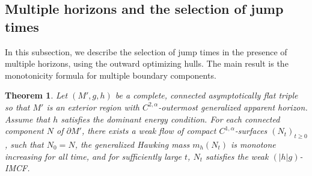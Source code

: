 \documentclass[11pt, letterpaper]{amsart}
\newtheorem{thm}{Theorem}[section]
\theoremstyle{definition}
\theoremstyle{remark}
\begin{document}
\subsection{Multiple horizons and the selection of jump times}\label{sect-multi-horizons}

In this subsection, we describe the selection of jump times in the presence of multiple horizons, using the outward optimizing hulls. The main result is the monotonicity formula for multiple boundary components.

\begin{thm}\label{thm-monotonicity-multiple}
	Let $(M', g, h)$ be a complete, connected asymptotically flat triple so that $M'$ is an exterior region with $C^{2,\alpha }$-outermost generalized apparent horizon. Assume that $h$ satisfies the dominant energy condition. For each connected component $N$ of $\partial M'$, there exists a weak flow of compact $C^{1,\alpha }$-surfaces $(N_{t})_{t \geq 0}$, such that $N_0 = N$, the generalized Hawking mass $m_{h}(N_t)$ is monotone increasing for all time, and for sufficiently large $t$, $N_t$ satisfies the weak $(|h|g)$-IMCF.
\end{thm}
\end{document}
